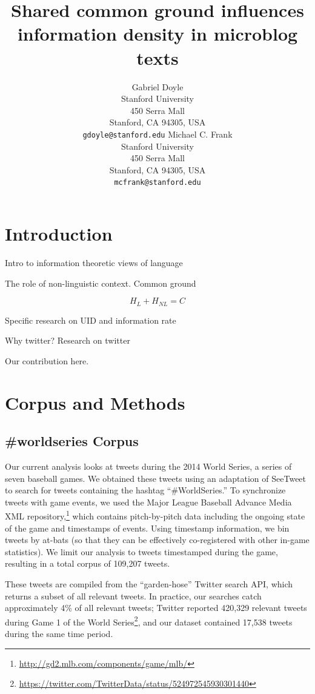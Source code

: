 \documentclass[11pt,letterpaper]{article}
\title{Shared common ground influences information density in microblog texts\Thanks{Thanks to...}}
\author{Gabriel Doyle\\
	    Stanford University\\
	    450 Serra Mall\\
	    Stanford, CA 94305, USA\\
	    {\tt gdoyle@stanford.edu}
	  \And
          Michael C. Frank\\
	    Stanford University\\
	    450 Serra Mall\\
	    Stanford, CA 94305, USA\\
	    {\tt mcfrank@stanford.edu}}
\date{}
\begin{document}
\maketitle
\begin{abstract}


\end{abstract}

\section{Introduction}

Intro to information theoretic views of language \cite{genzel2002}

The role of non-linguistic context. Common ground \cite{clark1996} \cite{brennan1990}

\begin{equation}
H_L+ H_{NL} = C
\end{equation}

Specific research on UID and information rate \cite{qian2012} \cite{levy2007}

Why twitter? Research on twitter

Our contribution here. 



\section{Corpus and Methods}

\subsection{\#worldseries Corpus}

Our current analysis looks at tweets during the 2014 World Series, a series of seven baseball games.  We obtained these tweets using an adaptation of SeeTweet \cite{doyle2014} to search for tweets containing the hashtag ``\#WorldSeries.''  To synchronize tweets with game events, we used the Major League Baseball Advance Media XML repository,\footnote{\url{http://gd2.mlb.com/components/game/mlb/}} which contains pitch-by-pitch data including the ongoing state of the game and timestamps of events. Using timestamp information, we bin tweets by at-bats (so that they can be effectively co-registered with other in-game statistics).  We limit our analysis to tweets timestamped during the game, resulting in a total corpus of 109,207 tweets.

These tweets are compiled from the ``garden-hose'' Twitter search API, which returns a subset of all relevant tweets. In practice, our searches catch approximately 4\% of all relevant tweets; Twitter reported 420,329 relevant tweets during Game 1 of the World Series\footnote{\url{https://twitter.com/TwitterData/status/524972545930301440}}, and our dataset contained 17,538 tweets during the same time period.
\end{document}
